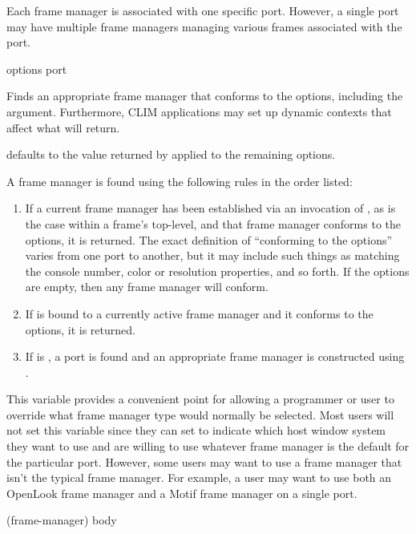 Each frame manager is associated with one specific port.  However, a single port
may have multiple frame managers managing various frames associated with the
port.


 {\rest options \key port \allow}

Finds an appropriate frame manager that conforms to the options, including the
 argument.  Furthermore, CLIM applications may set up dynamic contexts
that affect what  will return.

 defaults to the value returned by  applied to the remaining options.

A frame manager is found using the following rules in the order listed:

\begin{enumerate}
\item If a current frame manager has been established via an invocation of
, as is the case within a frame's top-level, and that
frame manager conforms to the options, it is returned.  The exact definition of
``conforming to the options'' varies from one port to another, but it may
include such things as matching the console number, color or resolution
properties, and so forth.  If the options are empty, then any frame manager will
conform.

\item If  is bound to a currently active frame
manager and it conforms to the options, it is returned.

\item If  is , a port is found and an appropriate
frame manager is constructed using .
\end{enumerate}



This variable provides a convenient point for allowing a programmer or user to
override what frame manager type would normally be selected.  Most users will
not set this variable since they can set  to indicate
which host window system they want to use and are willing to use whatever frame
manager is the default for the particular port.  However, some users may want to
use a frame manager that isn't the typical frame manager.  For example, a user
may want to use both an OpenLook frame manager and a Motif frame manager on a
single port.

 {(frame-manager) \body body}

